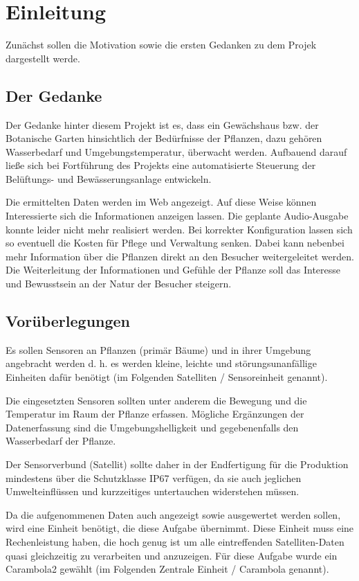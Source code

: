 \chapter{Einleitung}
Zunächst sollen die Motivation sowie die ersten Gedanken zu dem Projek dargestellt werde.
\section{Der Gedanke}
Der Gedanke hinter diesem Projekt ist es, dass ein Gewächshaus bzw. der Botanische Garten hinsichtlich der Bedürfnisse der Pflanzen, dazu gehören Wasserbedarf und Umgebungstemperatur, überwacht werden. Aufbauend darauf ließe sich bei Fortführung des Projekts eine automatisierte Steuerung der Belüftungs- und Bewässerungsanlage entwickeln.

Die ermittelten Daten werden im Web angezeigt. Auf diese Weise k\"onnen Interessierte sich die
Informationen anzeigen lassen. Die geplante Audio-Ausgabe konnte leider nicht mehr realisiert werden.
Bei korrekter Konfiguration lassen sich so eventuell die Kosten für Pflege und Verwaltung senken. Dabei kann nebenbei mehr Information über die Pflanzen direkt an den Besucher weitergeleitet werden. Die Weiterleitung der Informationen und Gefühle der Pflanze soll das Interesse und Bewusstsein an der Natur der Besucher steigern.

\section{Vorüberlegungen}
Es sollen Sensoren an Pflanzen (primär Bäume) und in ihrer Umgebung angebracht werden d. h. es werden kleine, leichte und störungsunanfällige Einheiten dafür benötigt (im Folgenden Satelliten / Sensoreinheit genannt).

Die eingesetzten Sensoren sollten unter anderem die Bewegung und die Temperatur im Raum der Pflanze erfassen.
M\"ogliche Erg\"anzungen der Datenerfassung sind die Umgebungshelligkeit und gegebenenfalls den Wasserbedarf der Pflanze.

Der Sensorverbund (Satellit) sollte daher in der Endfertigung für die Produktion mindestens über die Schutzklasse IP67 verfügen, da sie auch jeglichen Umwelteinflüssen und kurzzeitiges untertauchen widerstehen müssen.

Da die aufgenommenen Daten auch angezeigt sowie ausgewertet werden sollen, wird eine Einheit benötigt, die diese Aufgabe übernimmt. Diese Einheit muss eine Rechenleistung haben, die hoch genug ist um alle eintreffenden Satelliten-Daten quasi gleichzeitig zu verarbeiten und anzuzeigen. Für diese Aufgabe wurde ein Carambola2 gewählt (im Folgenden Zentrale Einheit / Carambola genannt).


